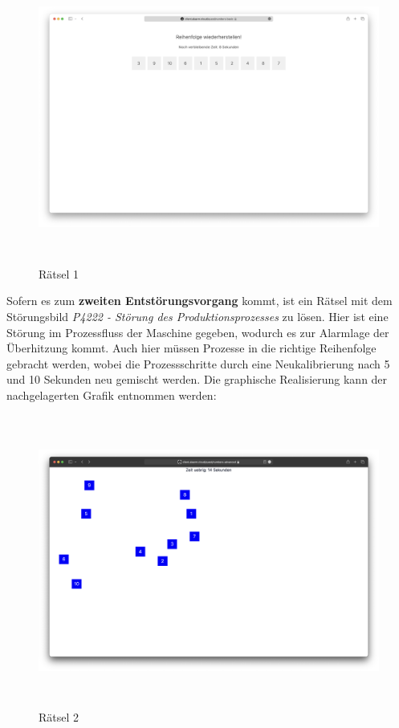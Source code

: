 \begin{figure}[H]
   \includegraphics[width=15cm, height=9.61cm]{res/quest_01.png}
   \caption{Rätsel 1}
\end{figure}

Sofern es zum \textbf{zweiten Entstörungsvorgang} kommt, ist ein Rätsel mit dem Störungsbild \textit{P4222 - Störung des Produktionsprozesses} zu lösen. Hier ist eine Störung im Prozessfluss der Maschine gegeben, wodurch es zur Alarmlage der Überhitzung kommt. Auch hier müssen Prozesse in die richtige Reihenfolge gebracht werden, wobei die Prozessschritte durch eine Neukalibrierung nach 5 und 10 Sekunden neu gemischt werden. Die graphische Realisierung kann der nachgelagerten Grafik entnommen werden:

\begin{figure}[H]
   \includegraphics[width=15cm, height=9.61cm]{res/quest_02.png}
   \caption{Rätsel 2}
\end{figure}

